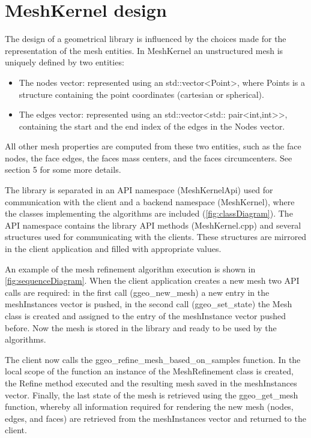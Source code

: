 \documentclass[biblatex]{deltares_manual}
\begin{document}
\chapter{MeshKernel design}

The design of a geometrical library is influenced by the choices made for the representation of the mesh entities. In MeshKernel an unstructured mesh is uniquely defined by two entities:
\begin{itemize}
\item The nodes vector: represented using an std::vector<Point>, where Points is a structure containing the point coordinates (cartesian or spherical).
\item The edges vector: represented using an std::vector<std:: pair<int,int>>, containing the start and the end index of the edges in the Nodes vector.
\end{itemize}
All other mesh properties are computed from these two entities, such as the face nodes, the face edges, the faces mass centers, and the faces circumcenters. See section 5 for some more details.

The library is separated in an API namespace (MeshKernelApi) used for communication with the client and a backend namespace (MeshKernel), where the classes implementing the algorithms are included (\ref{fig:classDiagram}). The API namespace contains the library API methods (MeshKernel.cpp) and several structures used for communicating with the clients. These structures are mirrored in the client application and filled with appropriate values.

An example of the mesh refinement algorithm execution is shown in \ref{fig:sequenceDiagram}. When the client application creates a new mesh two API calls are required: in the first call (ggeo\_new\_mesh) a new entry in the meshInstances vector is pushed, in the second call (ggeo\_set\_state) the Mesh class is created and assigned to the entry of the meshInstance vector pushed before. Now the mesh is stored in the library and ready to be used by the algorithms.

The client now calls the ggeo\_refine\_mesh\_based\_on\_samples function. In the local scope of the function an instance of the MeshRefinement class is created, the Refine method executed and the resulting mesh saved in the meshInstances vector. Finally, the last state of the mesh is retrieved using the ggeo\_get\_mesh function, whereby all information required for rendering the new mesh (nodes, edges, and faces) are retrieved from the meshInstances vector and returned to the client.
\end{document}
